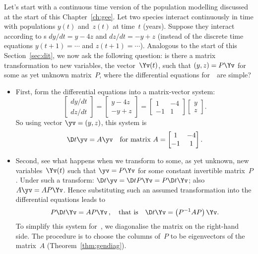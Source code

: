 Let's start with a continuous time version of the population modelling discussed at the start of this Chapter~\ref{ch:gee}.
Let two species interact continuously in time with populations \(y(t)\) and~\(z(t)\) at time~\(t\) (years).
Suppose they interact according to s \(dy/dt=y-4z\) and \(dz/dt=-y+z\) (instead of the discrete time equations \(y(t+1)=\cdots\) and \(z(t+1)=\cdots\)).
Analogous to the start of this Section~\ref{sec:dit}, we now ask the following question: is there a matrix transformation to new variables, the vector~\(\Yv(t)\), such that \((y,z)=P\Yv\) for some as yet unknown matrix~\(P\), where the differential equations for~\Yv\ are simple?
\begin{itemize}
\item First, form the differential equations into a matrix-vector system:
\begin{equation*}
\begin{bmatrix} dy/dt\\dz/dt \end{bmatrix}
=\begin{bmatrix} y-4z
\\ -y+z \end{bmatrix}
=\begin{bmatrix} 1&-4\\-1& 1 \end{bmatrix}\begin{bmatrix} y\\z \end{bmatrix}.
\end{equation*}
So using vector \(\yv=(y,z)\), this system is
\begin{equation*}
\D t\yv=A\yv
\quad\text{for matrix }A=\begin{bmatrix} 1&-4\\-1& 1 \end{bmatrix}.
\end{equation*}

\item Second, see what happens when we transform to some, as yet unknown, new variables~\(\Yv(t)\) such that \(\yv=P\Yv\) for some constant invertible matrix~\(P\).
Under such a transform: \(\D t\yv=\D t{}P\Yv=P\D t\Yv\); also \(A\yv=AP\Yv\).
Hence substituting such an assumed transformation into the differential equations leads to
\begin{equation*}
P\D t\Yv=AP\Yv\,, 
\quad\text{that is}\quad
\D t\Yv=\left(P^{-1}AP\right)\Yv.
\end{equation*}
To simplify this system for~\Yv, we diagonalise the matrix on the right-hand side.
The procedure is to choose the columns of~\(P\) to be eigenvectors of the matrix~\(A\) (Theorem~\ref{thm:gendiag}).


\end{itemize}
